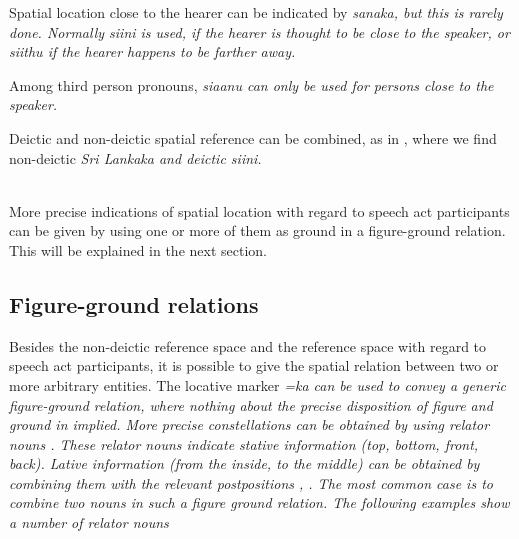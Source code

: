 Spatial location close to the hearer can be indicated by \em sanaka\em, but this is rarely done. Normally \em  siini \em is used, if the hearer is thought to be close to the speaker, or \em siithu \em if the hearer happens to be farther away.

Among third person pronouns, \em siaanu \em can only be used for persons close to the speaker.

Deictic and non-deictic spatial reference can be combined, as in , where we find non-deictic \em Sri Lankaka \em and deictic \em siini\em.

 \\

More precise indications of spatial location with regard to speech act participants can be given by using one or more of them as ground in a figure-ground relation. This will be explained in the next section.





\subsection{Figure-ground relations}\label{sec:func:Figure-groundrelations}
Besides the non-deictic reference space and the reference space with regard to speech act participants, it is possible to give the spatial relation between two or more arbitrary entities. The locative marker \em =ka \em can be used to convey a generic figure-ground relation, where nothing about the precise disposition of figure and ground in implied. More precise constellations can be obtained by using relator nouns \citep[25][cf.]{Adelaar1991}. These relator nouns indicate stative information (top, bottom, front, back). Lative information (from the inside, to the middle) can be obtained by combining them with the relevant postpositions ,  .
The most common case is to combine two nouns in such a figure ground relation. The following examples show a number of relator nouns

